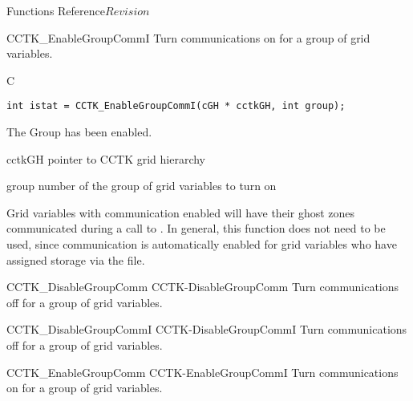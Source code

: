 \begin{cactuspart}{ Functions Reference}{}{$Revision$}
\begin{FunctionDescription}{CCTK\_EnableGroupCommI}
\label{CCTK-EnableGroupCommI}
Turn communications on for a group of grid variables.
\begin{SynopsisSection}
\begin{Synopsis}{C}
\begin{verbatim}
int istat = CCTK_EnableGroupCommI(cGH * cctkGH, int group);
\end{verbatim}
\end{Synopsis}
\end{SynopsisSection}

\begin{ResultSection}
\begin{Result}{0}
The Group has been enabled.
\end{Result}
\end{ResultSection}

\begin{ParameterSection}
\begin{Parameter}{cctkGH}
pointer to CCTK grid hierarchy
\end{Parameter}
\begin{Parameter}{group}
number of the group of grid variables to turn on
\end{Parameter}
\end{ParameterSection}

\begin{Discussion}
Grid variables with communication enabled will have their ghost zones communicated during a call
to . In general, this function does not need to be used, since communication
is automatically enabled for grid variables who have assigned storage via the 
file.
\end{Discussion}

\begin{SeeAlsoSection}
\begin{SeeAlso2} {CCTK\_DisableGroupComm} {CCTK-DisableGroupComm}
Turn communications off for a group of grid variables.
\end{SeeAlso2}
\begin{SeeAlso2} {CCTK\_DisableGroupCommI} {CCTK-DisableGroupCommI}
Turn communications off for a group of grid variables.
\end{SeeAlso2}
\begin{SeeAlso2} {CCTK\_EnableGroupComm} {CCTK-EnableGroupCommI}
Turn communications on for a group of grid variables.
\end{SeeAlso2}
\end{SeeAlsoSection}
\end{FunctionDescription}


\end{cactuspart}
